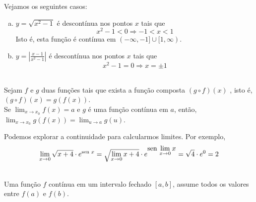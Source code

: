 \cleardoublepage\documentclass[../main.tex]{subfiles}
\begin{document}
\begin{ex}
  Vejamos os seguintes casos:
  \begin{enumerate}[a)]
  \item $y = \sqrt{x^2-1}$ é descontínua nos pontos $x$ tais que
    \begin{equation*}
      x^2-1<0\Rightarrow -1<x<1
    \end{equation*}
    Isto é, esta função é contínua em $(-\infty,-1]\cup[1,\infty)$.
  \item $\displaystyle y = \left|\frac{x-1}{x^2-1}\right|$ é descontínua nos pontos $x$ tais que
    \begin{equation*}
      x^2-1=0\Rightarrow x=\pm 1
    \end{equation*}
  \end{enumerate}
\end{ex}

\begin{framed}
\begin{teo}~
\\ Sejam $f$ e $g$ duas funções tais que exista a função composta $(g\circ f)(x)$ , isto é,  $(g\circ f)(x) = g( f (x ))$.\\%
Se $\displaystyle\lim_{x\to x_0} f(x)=a$ e $g$ é uma função contínua em $a$, então,$\displaystyle \lim_{x\to x_0} g(f(x))=\lim_{u\to a} g(u)$. 
\end{teo}
\end{framed}

\begin{ex}
  Podemos explorar a continuidade para calcularmos limites. Por exemplo,
  \begin{equation*}
    \lim_{x\to 0} \sqrt{x+4}\cdot e^{\operatorname{sen}\, x} = \sqrt{\lim_{x\to 0} x+4}\cdot e^{\displaystyle\operatorname{sen}\, \lim_{x\to 0} x} = \sqrt{4}\cdot e^{0} = 2
  \end{equation*}
\end{ex}

\begin{framed}\begin{teo}\label{teo:valorintermediario}
\\  Uma função $f$ contínua em um intervalo fechado $[a, b]$, assume todos os valores entre $f(a)$ e $f(b)$.
\end{teo}\end{framed}
\end{document}
